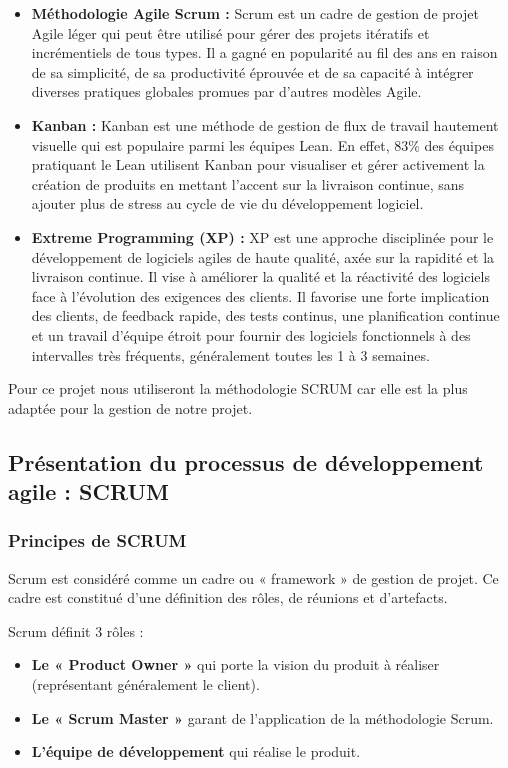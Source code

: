 \begin{itemize}
    \item \textbf{Méthodologie Agile Scrum : } Scrum  est un cadre de gestion de projet Agile léger qui peut être utilisé pour gérer des projets itératifs et incrémentiels de tous types. Il a gagné en popularité au fil des ans en raison de sa simplicité, de sa productivité éprouvée et de sa capacité à intégrer diverses pratiques globales promues par d'autres modèles Agile.
    \item \textbf{Kanban : } Kanban  est une méthode de gestion de flux de travail hautement visuelle qui est populaire parmi les équipes Lean. En effet, 83\% des équipes pratiquant le Lean utilisent Kanban pour visualiser et gérer activement la création de produits en mettant l'accent sur la livraison continue, sans ajouter plus de stress au cycle de vie du développement logiciel.
    \item \textbf{Extreme Programming (XP) : } XP est une approche disciplinée pour le développement de logiciels agiles de haute qualité, axée sur la rapidité et la livraison continue. Il vise à améliorer la qualité et la réactivité des logiciels face à l'évolution des exigences des clients. Il favorise une forte implication des clients, de feedback rapide, des tests continus, une planification continue et un travail d'équipe étroit pour fournir des logiciels fonctionnels à des intervalles très fréquents, généralement toutes les 1 à 3 semaines.
\end{itemize}

Pour ce projet nous utiliseront la méthodologie SCRUM car elle est la plus adaptée pour la gestion de notre projet.

\subsection{Présentation du processus de développement agile : SCRUM}
\subsubsection{Principes de SCRUM}
Scrum est considéré comme un cadre ou « framework » de gestion de projet. Ce cadre est constitué d'une définition des rôles, de réunions et d'artefacts.

Scrum définit 3 rôles :​
\begin{itemize}
    \item \textbf{Le « Product Owner »} qui porte la vision du produit à réaliser (représentant généralement le client).
    \item \textbf{Le « Scrum Master »} garant de l'application de la méthodologie Scrum.
    \item \textbf{L'équipe de développement} qui réalise le produit.
\end{itemize}

